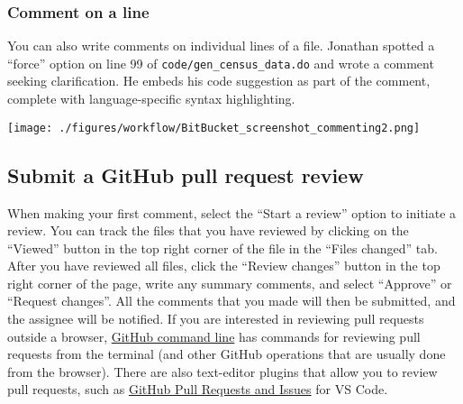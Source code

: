 \subsubsection{Comment on a line}
You can also write comments on individual lines of a file.
Jonathan spotted a ``force'' option on line 99 of \texttt{code/gen\_census\_data.do} and wrote a comment seeking clarification.
He embeds his code suggestion as part of the comment, complete with language-specific syntax highlighting.
\begin{center}\texttt{[image: ./figures/workflow/BitBucket\_screenshot\_commenting2.png]}\end{center}

\subsection{Submit a GitHub pull request review}
When making your first comment, select the ``Start a review'' option to initiate a review.
You can track the files that you have reviewed by clicking on the ``Viewed'' button
in the top right corner of the file in the ``Files changed'' tab.
After you have reviewed all files,
click the ``Review changes'' button in the top right corner of the page,
write any summary comments, and select ``Approve'' or ``Request changes''.
All the comments that you made will then be submitted, and the assignee will be notified.
If you are interested in reviewing pull requests outside a browser,
\href{https://cli.github.com/}{GitHub command line} has commands for
reviewing pull requests from the terminal
(and other GitHub operations that are usually done from the browser).
There are also text-editor plugins that allow you to review pull requests,
such as \href{https://marketplace.visualstudio.com/items?itemName=GitHub.vscode-pull-request-github}{GitHub Pull Requests and Issues} for VS Code.
